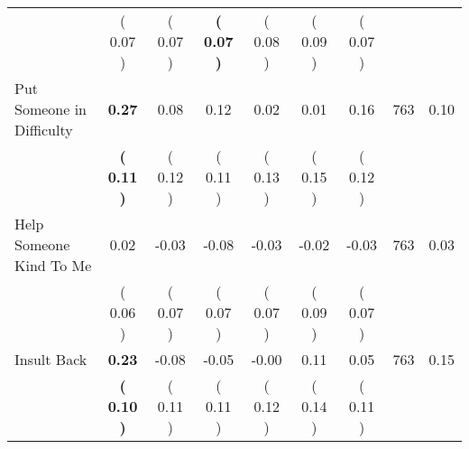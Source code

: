 \begin{tabular}{lcccccccc}
 & (     0.07 ) & (     0.07 ) & \textbf{(     0.07 )} & (     0.08 ) & (     0.09 ) & (     0.07 ) & \\
Put Someone in Difficulty & \textbf{     0.27} &      0.08 &      0.12 &      0.02 &      0.01 &      0.16 & 763 &       0.10 \\ 
 & \textbf{(     0.11 )} & (     0.12 ) & (     0.11 ) & (     0.13 ) & (     0.15 ) & (     0.12 ) & \\
Help Someone Kind To Me &      0.02 &     -0.03 &     -0.08 &     -0.03 &     -0.02 &     -0.03 & 763 &       0.03 \\ 
 & (     0.06 ) & (     0.07 ) & (     0.07 ) & (     0.07 ) & (     0.09 ) & (     0.07 ) & \\
Insult Back & \textbf{     0.23} &     -0.08 &     -0.05 &     -0.00 &      0.11 &      0.05 & 763 &       0.15 \\ 
 & \textbf{(     0.10 )} & (     0.11 ) & (     0.11 ) & (     0.12 ) & (     0.14 ) & (     0.11 ) & \\
\bottomrule
\end{tabular}
